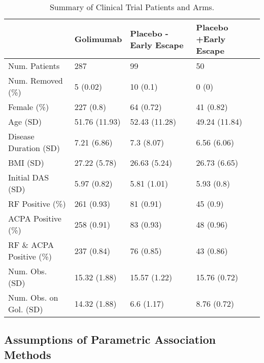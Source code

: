 \begin{table}
\centering
\def\arraystretch{1.2}
\begin{tabular}{| C{4cm} | C{2.5cm} | C{2.5cm} | C{2.5cm} | }
\hline
 & Golimumab & Placebo -\newline Early Escape & Placebo +\newline Early Escape \\
\hline
Num. Patients & 287 & 99 & 50 \\
Num. Removed (\%) & 5 (0.02) & 10 (0.1) & 0 (0) \\
Female (\%) & 227 (0.8) & 64 (0.72) & 41 (0.82) \\
Age (SD) & 51.76 (11.93) & 52.43 (11.28) & 49.24 (11.84) \\
Disease Duration (SD) & 7.21 (6.86) & 7.3 (8.07) & 6.56 (6.06) \\
BMI (SD) & 27.22 (5.78) & 26.63 (5.24) & 26.73 (6.65) \\
Initial DAS (SD) & 5.97 (0.82) & 5.81 (1.01) & 5.93 (0.8) \\
RF Positive (\%) & 261 (0.93) & 81 (0.91) & 45 (0.9) \\
ACPA Positive (\%) & 258 (0.91) & 83 (0.93) & 48 (0.96) \\
RF \& ACPA Positive (\%) & 237 (0.84) & 76 (0.85) & 43 (0.86) \\
Num. Obs. (SD) & 15.32 (1.88) & 15.57 (1.22) & 15.76 (0.72) \\
Num. Obs. on Gol. (SD) & 14.32 (1.88) & 6.6 (1.17) & 8.76 (0.72) \\
\hline
\end{tabular}
\caption{\label{Summary_Table} Summary of Clinical Trial Patients and Arms.}
\end{table}


\subsection{Assumptions of Parametric Association Methods}

